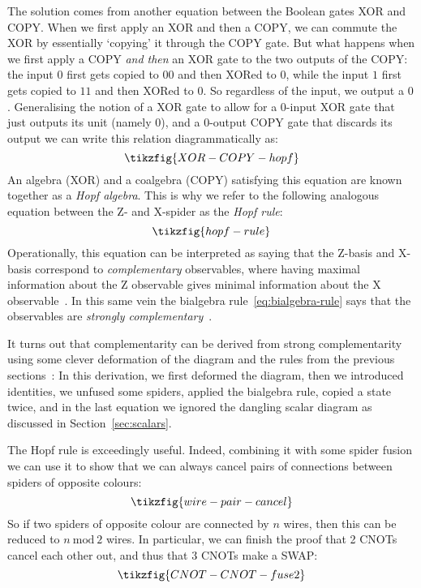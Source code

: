 \documentclass[a4paper,onecolumn,superscriptaddress,11pt,%
				unpublished,%
				allowfontchageintitle,%
				]{quantumarticle}
\begin{document}
The solution comes from another equation between the Boolean gates XOR and COPY. When we first apply an XOR and then a COPY, we can commute the XOR by essentially `copying' it through the COPY gate. But what happens when we first apply a COPY \emph{and then} an XOR gate to the two outputs of the COPY: the input $0$ first gets copied to $00$ and then XORed to $0$, while the input $1$ first gets copied to $11$ and then XORed to $0$. So regardless of the input, we output a $0$. Generalising the notion of a XOR gate to allow for a 0-input XOR gate that just outputs its unit (namely $0$), and a 0-output COPY gate that discards its output we can write this relation diagrammatically as:
\begin{equation}
\tikzfig{XOR-COPY-hopf}
\end{equation}
An algebra (XOR) and a coalgebra (COPY) satisfying this equation are known together as a \emph{Hopf algebra}. This is why we refer to the following analogous equation between the Z- and X-spider as the \emph{Hopf rule}:
\begin{equation}\label{eq:hopf-rule}
\tikzfig{hopf-rule}
\end{equation}
Operationally, this equation can be interpreted as saying that the Z-basis and X-basis correspond to \emph{complementary} observables, where having maximal information about the Z observable gives minimal information about the X observable~\cite[Section~9.2]{CKbook}.
In this same vein the bialgebra rule~\eqref{eq:bialgebra-rule} says that the observables are \emph{strongly complementary}~\cite{coecke2012strong}.

It turns out that complementarity can be derived from strong complementarity using some clever deformation of the diagram and the rules from the previous sections~\cite{duncan2016interacting}:
In this derivation, we first deformed the diagram, then we introduced identities, we unfused some spiders, applied the bialgebra rule, copied a state twice, and in the last equation we ignored the dangling scalar diagram as discussed in Section~\ref{sec:scalars}.

The Hopf rule is exceedingly useful. Indeed, combining it with some spider fusion we can use it to show that we can always cancel pairs of connections between spiders of opposite colours:
\begin{equation}\label{eq:wire-pair-cancel}
\tikzfig{wire-pair-cancel}
\end{equation}
So if two spiders of opposite colour are connected by $n$ wires, then this can be reduced to $n~\text{mod}~2$ wires.
In particular, we can finish the proof that 2 CNOTs cancel each other out, and thus that 3 CNOTs make a SWAP:
\begin{equation}
\tikzfig{CNOT-CNOT-fuse2}
\end{equation}
\end{document}
